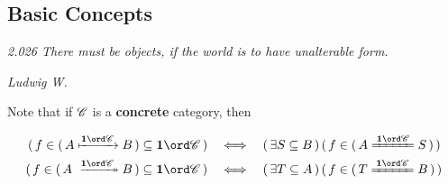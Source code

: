 \subsection{Basic Concepts}
\epigraph{\footnotesize \textit{2.026 There must be objects, if the world is to have unalterable form.}}{\footnotesize \textit{Ludwig W.}}

Note that if \(\mathscr{C}\) is a \textbf{concrete} category, then
\begin{theorem}
  \begin{align*}
    \blk{f\in \col{A \mono{\cc} B} \subseteq \cat{1}{\cc}} &\corres \blk{\exists S\subseteq B}\,\blk{f\in \col{A \iso{\cc} S}} \\
    \blk{f\in \col{A \epi{\cc} B} \subseteq \cat{1}{\cc}} &\corres \blk{\exists T\subseteq A}\,\blk{f\in \col{T \iso{\cc} B}}
  \end{align*}
\end{theorem}